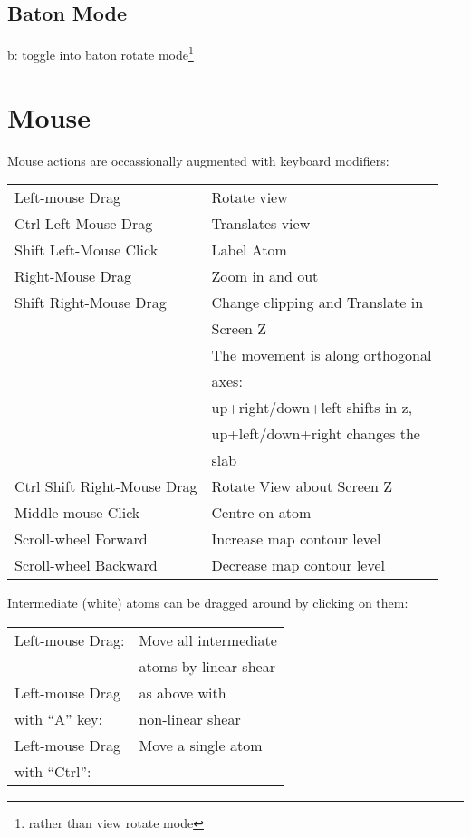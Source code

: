 \documentclass[twocolumn]{article}
\begin{document}
\subsection{Baton Mode}
b: toggle into baton rotate mode\footnote{rather than view rotate
  mode}

\newpage
\section{Mouse}
Mouse actions are occassionally augmented with keyboard modifiers:
  \vspace{5mm}

  \begin{tabular}{ll}
    Left-mouse Drag & Rotate view \\
    Ctrl Left-Mouse Drag &  Translates view \\
    Shift Left-Mouse Click &  Label Atom\\
    Right-Mouse Drag &  Zoom in and out\index{zoom}\\
    Shift Right-Mouse Drag & Change clipping and Translate in \\
                           & Screen Z \\
                           & The movement is along orthogonal \\
                           & axes: \\
                           & up+right/down+left shifts in z, \\ 
                           &  up+left/down+right changes the \\
                           & slab \\
    Ctrl Shift Right-Mouse Drag &  Rotate View about Screen Z\\
    Middle-mouse Click & Centre on atom\\
    Scroll-wheel Forward &  Increase map contour level\\
    Scroll-wheel Backward &  Decrease map contour level
  \end{tabular}

  \vspace{5mm}
  Intermediate (white) atoms can be dragged around by clicking on
  them:

  \vspace{5mm}
\begin{tabular}{ll}
 Left-mouse Drag:     & Move all intermediate \\
                      & atoms by linear shear \\
 Left-mouse Drag  & as above with\\
  with ``A'' key:
                                 &  non-linear shear\\
 Left-mouse Drag & Move a single atom\\
 with ``Ctrl'': 
\end{tabular}
\end{document}
